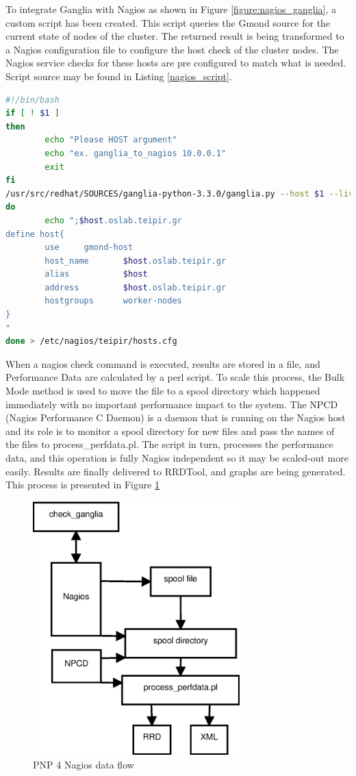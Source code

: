 To integrate Ganglia with Nagios as shown in Figure \ref{figure:nagios_ganglia}, a custom script has been created. This script queries the Gmond source for the current state of nodes of the cluster. The returned result is being transformed to a Nagios configuration file to configure the host check of the cluster nodes. The Nagios service checks for these hosts are pre configured to match what is needed. Script source may be found in Listing \ref{nagios_script}.

\begin{lstlisting}[language=bash,caption=Ganglia to Nagios script,label=nagios_script]
#!/bin/bash
if [ ! $1 ]
then
        echo "Please HOST argument"
        echo "ex. ganglia_to_nagios 10.0.0.1"
        exit
fi
/usr/src/redhat/SOURCES/ganglia-python-3.3.0/ganglia.py --host $1 --live | while read host
do
        echo ";$host.oslab.teipir.gr
define host{
        use     gmond-host
        host_name       $host.oslab.teipir.gr
        alias           $host
        address         $host.oslab.teipir.gr
        hostgroups      worker-nodes
}
"
done > /etc/nagios/teipir/hosts.cfg
\end{lstlisting}

When a nagios check command is executed, results are stored in a file, and Performance Data are calculated by a perl script. To scale this process, the Bulk Mode method is used to move the file to a spool directory which happened immediately with no important performance impact to the system. The NPCD (Nagios Performance C Daemon) is a daemon that is running on the Nagios host and its role is to monitor a spool directory for new files and pass the names of the files to process\_perfdata.pl. The script in turn, processes the performance data, and this operation is fully Nagios independent so it may be scaled-out more easily. Results are finally delivered to RRDTool, and graphs are being generated. This process is presented in Figure \ref{figure:pnp4nagios}

\begin{figure}[htb]
\centering
 \includegraphics[width=80mm]{images/npcd_pnp4nagios.eps}
\caption{PNP 4 Nagios data flow}
\label{figure:pnp4nagios}
\end{figure}

